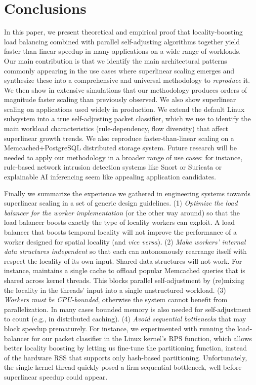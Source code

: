 \section{Conclusions}\label{sec:conclusions}

In this paper, we present theoretical and empirical proof that locality-boosting load balancing combined with parallel self-adjusting algorithms together yield faster-than-linear speedup in many applications on a wide range of workloads. Our main contribution is that we identify the main architectural patterns commonly appearing in the use cases where superlinear scaling emerges and synthesize these into a comprehensive and universal methodology to \emph{reproduce} it.  We then show in extensive simulations that our methodology produces orders of magnitude faster scaling than previously observed. We also show superlinear scaling on applications used widely in production. We extend the default \nftables Linux subsystem into a true self-adjusting packet classifier, which we use to identify the main workload characteristics (rule-dependency, flow diversity) that affect superlinear growth trends.  We also reproduce faster-than-linear scaling on a Memcached+PostgreSQL distributed storage system. Future research will be needed to apply our methodology in a broader range of use cases: for instance, rule-based network intrusion detection systems like Snort or Suricata \cite{10.5555/2537857.2537883} or explainable AI inferencing seem like appealing application candidates.

Finally we summarize the experience we gathered in engineering systems towards superlinear scaling in a set of generic design guidelines. (1) \emph{Optimize the load balancer for the worker implementation} (or the other way around) so that the load balancer boosts exactly the type of locality workers can exploit. A load balancer that boosts temporal locality will not improve the performance of a worker designed for spatial locality (and \emph{vice versa}). (2) \emph{Make workers' internal data structures independent} so that each can autonomously rearrange itself with respect the locality of its own input. Shared data structures will not work. For instance, \cite{ghigoff2021bmc} maintains a single cache to offload popular Memcached queries that is shared across kernel threads. This blocks parallel self-adjustment by (re)mixing the locality in the threads' input into a single unstructured workload. (3) \emph{Workers must be CPU-bounded}, otherwise the system cannot benefit from parallelization. In many cases bounded memory is also needed for self-adjustment to count (e.g., in distributed caching). (4) \emph{Avoid sequential bottlenecks} that may block speedup prematurely. For instance, we experimented with running the load-balancer for our packet classifier in the Linux kernel's RPS function, which allows better locality boosting by letting us fine-tune the partitioning function, instead of the hardware RSS that supports only hash-based partitioning. Unfortunately, the single kernel thread quickly posed a firm sequential bottleneck, well before superlinear speedup could appear.



